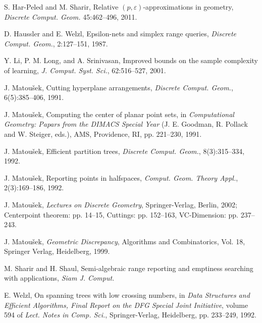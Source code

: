 \documentclass[11pt]{article}
\def\peps{(p,\varepsilon)}
\begin{document}
\begin{thebibliography}{}
S. Har-Peled and M. Sharir,
Relative $\peps$-approximations in geometry,
{\em Discrete Comput. Geom.} 45:462--496, 2011.

D. Haussler and E. Welzl,
Epsilon-nets and simplex range queries,
{\em Discrete Comput. Geom.}, 2:127--151, 1987.

Y. Li, P. M. Long, and A. Srinivasan,
Improved bounds on the sample complexity of learning,
{\em J. Comput. Syst. Sci.}, 62:516--527, 2001.

J. Matou\v{s}ek,
Cutting hyperplane arrangements,
{\em Discrete Comput. Geom.}, 6(5):385--406, 1991.

J. Matou\v{s}ek,
Computing the center of planar point sets,
in {\em Computational Geometry: Papars from the DIMACS Special Year}
(J. E. Goodman, R. Pollack and W. Steiger, eds.),
AMS, Providence, RI, pp. 221--230, 1991.

J. Matou\v{s}ek,
Efficient partition trees,
{\em Discrete Comput. Geom.}, 8(3):315--334, 1992.

J. Matou\v{s}ek,
Reporting points in halfspaces,
{\em Comput. Geom. Theory Appl.}, 2(3):169--186, 1992.

J. Matou\v{s}ek,
{\em Lectures on Discrete Geometry}, Springer-Verlag, Berlin, 2002;
Centerpoint theorem: pp. 14--15, Cuttings: pp. 152--163, VC-Dimension: pp. 237--243.

J. Matou\v{s}ek,
{\em Geometric Discrepancy}, Algorithms and Combinatorics,
Vol. 18, Springer Verlag, Heidelberg, 1999.

M. Sharir and H. Shaul,
Semi-algebraic range reporting and emptiness searching with applications,
{\em Siam J. Comput.}

E. Welzl, On spanning trees with low crossing numbers, in
{\em Data Structures and Efficient Algorithms, Final Report on the DFG Special Joint Initiative},
volume 594 of {\em Lect. Notes in Comp. Sci.}, Springer-Verlag, Heidelberg, pp. 233--249, 1992.

\end{thebibliography}
\end{document}
